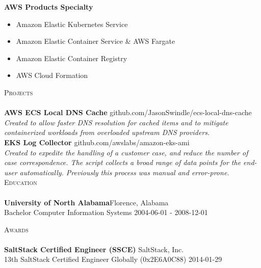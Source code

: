 \documentclass[a4paper]{article}
\newcommand{\lineunder} {
    \vspace*{-8pt} \\
    \hspace*{-18pt} \hrulefill \\
}
\newcommand{\header} [1] {
    {\hspace*{-18pt}\vspace*{6pt} \textsc{#1}}
    \vspace*{-6pt} \lineunder
}
\begin{document}
\textbf{AWS Products Specialty}\\
\vspace{-1mm}
\begin{itemize} \itemsep 1pt
    \item Amazon Elastic Kubernetes Service
    \item Amazon Elastic Container Service \& AWS Fargate
    \item Amazon Elastic Container Registry
    \item AWS Cloud Formation
\end{itemize}

\header{Projects}
\textbf{AWS ECS Local DNS Cache} \hfill github.com/JasonSwindle/ecs-local-dns-cache\\
\textit{Created to allow faster DNS resolution for cached items and to mitigate containerized workloads from overloaded upstream DNS providers.} \\[1\baselineskip]


\textbf{EKS Log Collector} \hfill github.com/awslabs/amazon-eks-ami\\
\textit{Created to expedite the handling of a customer case, and reduce the number of case correspondence. The script collects a broad range of data points for the end-user automatically. Previously this process  was manual and error-prone.} \\[1\baselineskip]


\header{Education}
\textbf{University of North Alabama}\hfill Florence, Alabama\\
Bachelor Computer Information Systems \hfill 2004-06-01 - 2008-12-01\\
\vspace{2mm}

\header{Awards}
\textbf{SaltStack Certified Engineer (SSCE)} \hfill SaltStack, Inc.\\
13th SaltStack Certified Engineer Globally (0x2E6A0C88) \hfill 2014-01-29\\
\vspace*{2mm}
\end{document}
